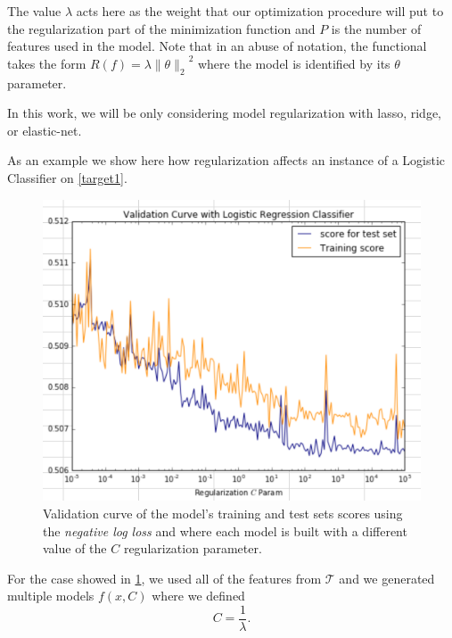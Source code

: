 
%


The value $\lambda$ acts here as the weight that our optimization procedure will put to the regularization part of the minimization function and $P$ is the number of features used in the model. Note that in an abuse of notation, the functional takes the form $R(f) = \lambda { \| \theta \|_{2}}^2$ where the model is identified by its $\theta$ parameter.

In this work, we will be only considering model regularization with lasso, ridge, or elastic-net.

As an example we show here how regularization affects an instance of a Logistic Classifier on \cref{target1}.


\begin{figure}[h!]
\begin{center}
\includegraphics[width=0.7\columnwidth]{figures/regularization/figure-log_loss_error_validation_curve.png}
\caption{ Validation curve of the model's training and test sets scores using the \textit{negative log loss} and where each model is built with a different value of the $C$ regularization parameter.}
\label{fig:log_loss_regularization_validation_curve}
\end{center}
\end{figure}

For the case  showed in \cref{fig:log_loss_regularization_validation_curve}, we used all of the features from $\mathcal{T}$ and we generated multiple models $f(x,C)$ where we defined
$$C = \frac{1}{\lambda} .$$


